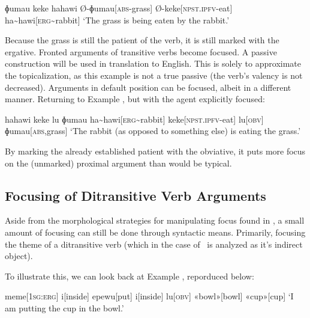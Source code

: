 \ex
\begingl
\glpreamble ɸumau keke hahawi
\endpreamble
Ø-ɸumau[\textsc{abs-}grass]
Ø-keke[\textsc{npst.ipfv-}eat]
ha\textasciitilde hawi[\textsc{erg\textasciitilde}rabbit]
\glft `The grass is being eaten by the rabbit.'
\endgl
\xe

Because the grass is still the patient of the verb, it is still marked with the ergative. Fronted arguments of transitive verbs become focused. A passive construction will be used in translation to English. This is solely to approximate the topicalization, as this example is not a true passive (the verb's valency is not decreased). Arguments in default position can be focused, albeit in a different manner. Returning to Example , but with the agent explicitly focused:

\ex
\begingl
\glpreamble hahawi keke lu ɸumau
\endpreamble
ha\textasciitilde hawi[\textsc{erg\textasciitilde}rabbit]
keke[\textsc{npst.ipfv-}eat]
lu[\textsc{obv}]
ɸumau[\textsc{abs,}grass]
\glft `The rabbit (as opposed to something else) is eating the grass.'
\endgl
\xe

By marking the already established patient with the obviative\footnotemark, it puts more focus on the (unmarked) proximal argument than would be typical.


\subsection{Focusing of Ditransitive Verb Arguments}\label{sec:ditrans_focus}

Aside from the morpho­logical strategies for manipulating focus found in , a small amount of focusing can still be done through syntactic means. Primarily, focusing the theme of a ditransitive verb (which in the case of \langname\ is analyzed as it's indirect object).

To illustrate this, we can look back at Example , reporduced below:

\ex
\begingl
\glpreamble
\pronounced{}\endpreamble
meme[\textsc{1sg:erg}]
i[inside]
epewu[put]
i[inside]
lu[\textsc{obv}]
«bowl»[bowl]
«cup»[cup]
\glft `I am putting the cup in the bowl.'
\endgl
\xe

